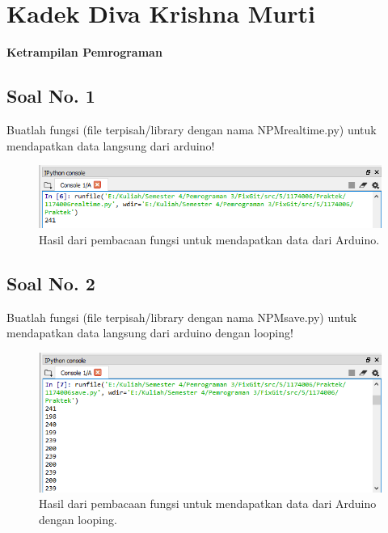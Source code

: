 \section{Kadek Diva Krishna Murti}
{\Large \textbf{Ketrampilan Pemrograman}}
\subsection{Soal No. 1}
Buatlah  fungsi  (file  terpisah/library  dengan  nama  NPMrealtime.py)  untuk mendapatkan data langsung dari arduino!


\begin{figure}[H]
	\includegraphics[width=12cm]{figures/5/1174006/Praktek/1.png}
	\centering
	\caption{Hasil dari pembacaan fungsi untuk mendapatkan data dari Arduino.}
\end{figure}

\subsection{Soal No. 2}
Buatlah fungsi (file terpisah/library dengan nama NPMsave.py) untuk mendapatkan data langsung dari arduino dengan looping!


\begin{figure}[H]
	\includegraphics[width=12cm]{figures/5/1174006/Praktek/2.png}
	\centering
	\caption{Hasil dari pembacaan fungsi untuk mendapatkan data dari Arduino dengan looping.}
\end{figure}

